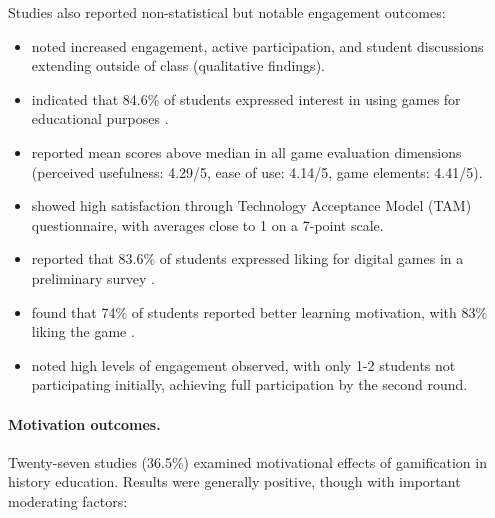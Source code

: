 \documentclass[a4paper,fleqn]{cas-sc}
\begin{document}
Studies also reported non-statistical but notable engagement outcomes:

\begin{itemize}[noitemsep]
 \item \citet{3Watson2011466} noted increased engagement, active participation, and student discussions extending outside of class (qualitative findings).
 \item \citet{4Cruz2017} indicated that 84.6\% of students expressed interest in using games for educational purposes \citep{4Cruz2017}.
 
 \item \citet{19Chou2019} reported mean scores above median in all game evaluation dimensions (perceived usefulness: 4.29/5, ease of use: 4.14/5, game elements: 4.41/5).
 \item \citet{24Ghannem2019} showed high satisfaction through Technology Acceptance Model (TAM) questionnaire, with averages close to 1 on a 7-point scale.
 \item \citet{52Lin2011265} reported that 83.6\% of students expressed liking for digital games in a preliminary survey \citep{52Lin2011265}.
 
 \item \citet{67Lin201296} found that 74\% of students reported better learning motivation, with 83\% liking the game \citep{67Lin201296}.
 
 \item \citet{80gottlieb2018your} noted high levels of engagement observed, with only 1-2 students not participating initially, achieving full participation by the second round.
\end{itemize}

\paragraph{Motivation outcomes.}

Twenty-seven studies (36.5\%) examined motivational effects of gamification in history education. Results were generally positive, though with important moderating factors:
\end{document}
